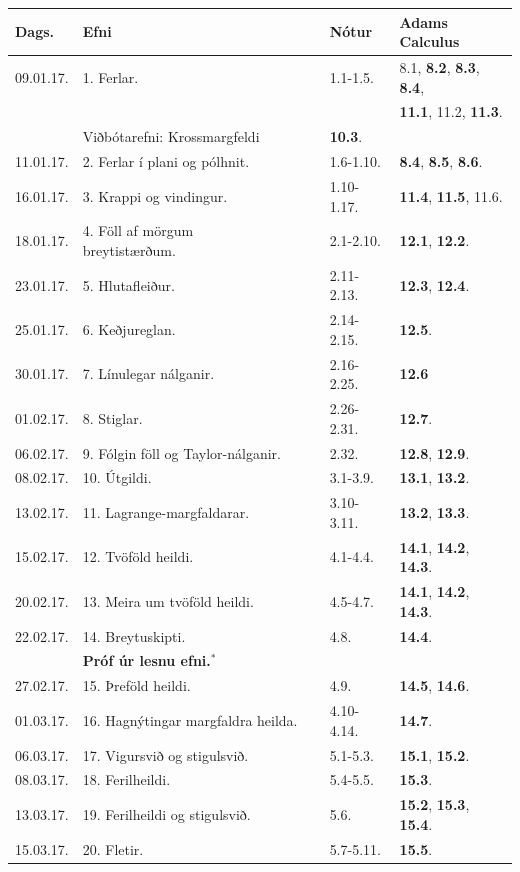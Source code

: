 \documentclass[a4paper,10pt,icelandic]{sphinxmanual}
\begin{document}
\begin{center}
\begin{tabular}{l|l|l|l}
Dags. &Efni & Nótur &Adams Calculus\\
\hline
09.01.17.&1. Ferlar.&    1.1-1.5.     &8.1, {\bf 8.2}, {\bf 8.3}, {\bf 8.4},\\
&&&{\bf 11.1}, 11.2, {\bf 11.3}.\\
&Viðbótarefni:  Krossmargfeldi& {\bf 10.3}.\\
11.01.17.&2. Ferlar í plani og pólhnit.& 1.6-1.10.& {\bf 8.4}, {\bf 8.5}, {\bf 8.6}.\\
\hline
16.01.17.&3. Krappi og vindingur.& 1.10-1.17.& {\bf 11.4}, {\bf 11.5}, 11.6.\\
18.01.17.&4. Föll af mörgum 
breytistærðum.\ \ \ \ \ \ & 2.1-2.10.& {\bf 12.1}, {\bf 12.2}.\\
\hline
23.01.17.&5. Hlutafleiður.& 2.11-2.13.&{\bf 12.3}, {\bf 12.4}.\\
25.01.17.&6. Keðjureglan.&2.14-2.15.&{\bf 12.5}.\\
\hline
30.01.17.&7. Línulegar nálganir.&2.16-2.25.&{\bf 12.6}\\
01.02.17.&8. Stiglar.&2.26-2.31.&{\bf 12.7}.\\
\hline
06.02.17.&9. Fólgin föll og Taylor-nálganir.&2.32.&{\bf 12.8}, {\bf 12.9}.\\
08.02.17.&10. Útgildi. &3.1-3.9.&{\bf 13.1}, {\bf 13.2}.\\
\hline
13.02.17.&11. Lagrange-margfaldarar. &3.10-3.11.&{\bf 13.2}, {\bf 13.3}.\\
15.02.17.&12. Tvöföld heildi. &4.1-4.4.&{\bf 14.1}, {\bf 14.2}, {\bf 14.3}.\\
\hline
20.02.17.&13. Meira um tvöföld heildi. &4.5-4.7.&{\bf 14.1}, {\bf 14.2}, {\bf 14.3}.\\
22.02.17.&14. Breytuskipti. &4.8.&{\bf 14.4}.\\
&  {\bf Próf úr  lesnu efni.$^\ast$}&\\
\hline
27.02.17.&15. Þreföld heildi. &4.9.& {\bf 14.5}, {\bf 14.6}.\\
01.03.17.&16. Hagnýtingar margfaldra heilda.&4.10-4.14. &{\bf 14.7}.\\
\hline
06.03.17.&17. Vigursvið og stigulsvið. &5.1-5.3.&{\bf 15.1}, {\bf 15.2}.\\
08.03.17.&18. Ferilheildi. & 5.4-5.5.&{\bf 15.3}. \\
\hline
13.03.17.&19. Ferilheildi og stigulsvið. &5.6.&{\bf 15.2}, {\bf 15.3}, {\bf 15.4}.\\
15.03.17.&20. Fletir. &5.7-5.11.&{\bf 15.5}. \\

\end{tabular}
\end{center}
\end{document}
